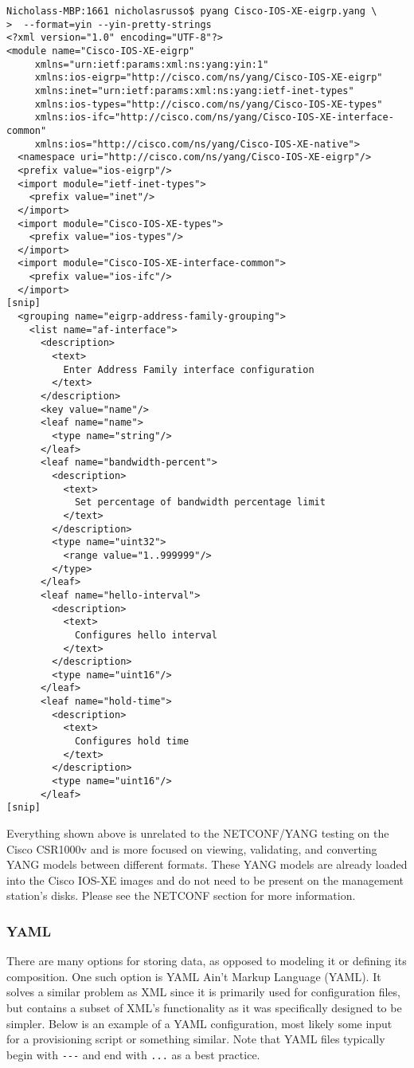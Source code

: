 \begin{verbatim}
Nicholass-MBP:1661 nicholasrusso$ pyang Cisco-IOS-XE-eigrp.yang \
>  --format=yin --yin-pretty-strings
<?xml version="1.0" encoding="UTF-8"?>
<module name="Cisco-IOS-XE-eigrp"
     xmlns="urn:ietf:params:xml:ns:yang:yin:1"
     xmlns:ios-eigrp="http://cisco.com/ns/yang/Cisco-IOS-XE-eigrp"
     xmlns:inet="urn:ietf:params:xml:ns:yang:ietf-inet-types"
     xmlns:ios-types="http://cisco.com/ns/yang/Cisco-IOS-XE-types"
     xmlns:ios-ifc="http://cisco.com/ns/yang/Cisco-IOS-XE-interface-common"
     xmlns:ios="http://cisco.com/ns/yang/Cisco-IOS-XE-native">
  <namespace uri="http://cisco.com/ns/yang/Cisco-IOS-XE-eigrp"/>
  <prefix value="ios-eigrp"/>
  <import module="ietf-inet-types">
    <prefix value="inet"/>
  </import>
  <import module="Cisco-IOS-XE-types">
    <prefix value="ios-types"/>
  </import>
  <import module="Cisco-IOS-XE-interface-common">
    <prefix value="ios-ifc"/>
  </import>
[snip]
  <grouping name="eigrp-address-family-grouping">
    <list name="af-interface">
      <description>
        <text>
          Enter Address Family interface configuration
        </text>
      </description>
      <key value="name"/>
      <leaf name="name">
        <type name="string"/>
      </leaf>
      <leaf name="bandwidth-percent">
        <description>
          <text>
            Set percentage of bandwidth percentage limit
          </text>
        </description>
        <type name="uint32">
          <range value="1..999999"/>
        </type>
      </leaf>
      <leaf name="hello-interval">
        <description>
          <text>
            Configures hello interval
          </text>
        </description>
        <type name="uint16"/>
      </leaf>
      <leaf name="hold-time">
        <description>
          <text>
            Configures hold time
          </text>
        </description>
        <type name="uint16"/>
      </leaf>   
[snip]
\end{verbatim}

Everything shown above is unrelated to the NETCONF/YANG testing on the Cisco
CSR1000v and is more focused on viewing, validating, and converting YANG
models between different formats. These YANG models are already loaded into
the Cisco IOS-XE images and do not need to be present on the management
station's disks. Please see the NETCONF section for more information.

\subsubsection{YAML}
There are many options for storing data, as opposed to modeling it or defining
its composition. One such option is YAML Ain’t Markup Language (YAML). It
solves a similar problem as XML since it is primarily used for configuration
files, but contains a subset of XML's functionality as it was specifically
designed to be simpler. Below is an example of a YAML configuration, most
likely some input for a provisioning script or something similar. Note that
YAML files typically begin with \verb|---| and end with \verb|...| as a best practice.

